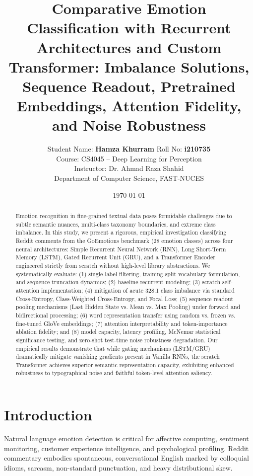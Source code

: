 \documentclass[10pt,twocolumn,letterpaper]{article}
\title{\textbf{Comparative Emotion Classification with Recurrent Architectures and Custom Transformer: Imbalance Solutions, Sequence Readout, Pretrained Embeddings, Attention Fidelity, and Noise Robustness}}
\author{
    Student Name: \textbf{Hamza Khurram} \quad Roll No: \textbf{i210735} \\
    Course: CS4045 -- Deep Learning for Perception \\
    Instructor: Dr. Ahmad Raza Shahid \\
    Department of Computer Science, FAST-NUCES
}
\date{\today}
\begin{document}
\maketitle

\begin{abstract}
Emotion recognition in fine-grained textual data poses formidable challenges due to subtle semantic nuances, multi-class taxonomy boundaries, and extreme class imbalance. In this study, we present a rigorous, empirical investigation classifying Reddit comments from the GoEmotions benchmark (28 emotion classes) across four neural architectures: Simple Recurrent Neural Network (RNN), Long Short-Term Memory (LSTM), Gated Recurrent Unit (GRU), and a Transformer Encoder engineered strictly from scratch without high-level library abstractions. We systematically evaluate: (1) single-label filtering, training-split vocabulary formulation, and sequence truncation dynamics; (2) baseline recurrent modeling; (3) scratch self-attention implementation; (4) mitigation of acute 328:1 class imbalance via standard Cross-Entropy, Class-Weighted Cross-Entropy, and Focal Loss; (5) sequence readout pooling mechanisms (Last Hidden State vs. Mean vs. Max Pooling) under forward and bidirectional processing; (6) word representation transfer using random vs. frozen vs. fine-tuned GloVe embeddings; (7) attention interpretability and token-importance ablation fidelity; and (8) model capacity, latency profiling, McNemar statistical significance testing, and zero-shot test-time noise robustness degradation. Our empirical results demonstrate that while gating mechanisms (LSTM/GRU) dramatically mitigate vanishing gradients present in Vanilla RNNs, the scratch Transformer achieves superior semantic representation capacity, exhibiting enhanced robustness to typographical noise and faithful token-level attention saliency.
\end{abstract}

\section{Introduction}
Natural language emotion detection is critical for affective computing, sentiment monitoring, customer experience intelligence, and psychological profiling. Reddit commentary embodies spontaneous, conversational English marked by colloquial idioms, sarcasm, non-standard punctuation, and heavy distributional skew.
\end{document}
